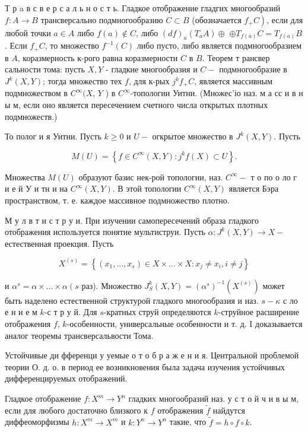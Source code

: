 \documentclass[10pt]{article}
\begin{document}
Т р a в с в е р с а л ь н о с т ь. Гладкое отображение гладгих многообразий $f: A \rightarrow B$ трансверсально подмногообразию $C \subset B$ (обозначается $\left.f_{+} C\right)$, если для любой точки $a \in A$ либо $f(a) \notin C$, либо $(d f)_{a}\left(T_{a} A\right) \oplus$ $\oplus T_{f(a)} C=T_{f(a)} B$. Если $f_{+} C$, то множество $f^{-1}(C)$ либо пусто, либо является подмногообразием в $A$, коразмерность к-рого равна коразмерности $C$ в $B$. Теорем т рансвер сальности тома: пусть $X, Y$ - гладкие многообразия и $C-$ подмногообразие в $J^{k}(X, Y)$; тогда множество тех $f$, для к-рых $j^{k} f_{+} C$, является массивным подмножеством в $C^{\infty}(X$, $Y$ ) в $C^{\infty}$-топологии Уитни. (Множес'іо наз. м а сс и в н ы м, если оно является пересечением счетного числа открытых плотных подмножеств.)

То полог и я Уитни. Пусть $k \geqslant 0$ и $U-$ огкрытое множество в $J^{k}(X, Y)$. Пусть

\[
M(U)=\left\{f \in C^{\infty}(X, Y): j^{k} f(X) \subset U\right\} .
\]

Множества $M(U)$ образуют базис нек-рой топологии, наз. $C^{\infty}-$ т о по о ло г и е й У и тн и на $C^{\infty}(X, Y)$. В этой топологии $C^{\infty}(X, Y)$ является Бэра пространством, т. е. каждое массивное подмножество плотно.

М у л в т и с т р у и. При изучении самопересечений образа гладкого отображения используется понятие мультиструи. Пусть $\alpha: J^{k}(X, Y) \rightarrow X-$ естественная проекция. Пусть

\[
X^{(s)}=\left\{\left(x_{1}, \ldots, x_{s}\right) \in X \times \ldots \times X: x_{j} \neq x_{i}, i \neq j\right\}
\]

и $\alpha^{s}=\alpha \times \ldots \times \alpha\left(s\right.$ раз). Множество $J_{S}^{k}(X, Y)=\left(\alpha^{s}\right)^{-1}\left(X^{(s)}\right)$ может быть наделено естественной структурой гладкого многообразия и наз. $s-\kappa$ с ло е н и е м $k$-с т р у й. Для $s$-кратных струй определяются $k$-струйное расширение отображения $f$, $k$-особенности, универсальные особенности и т. д. I доказывается аналог теоремы трансверсальвости Тома.

Устойчивые ди фференци у уемые о т о б р а ж е н и я. Центральной проблемой теории О. д. о. в период ее возникновения была задача изучения устойчивых дифференцируемых отображений.

Гладкое отображение $f: X^{m} \rightarrow Y^{n}$ гладких многообразий наз. у с т о й ч и в ы м, если для любого достаточно близкого к $f$ отображения $\tilde{f}$ найдутся диффеоморфизмы $h: X^{m} \rightarrow X^{m}$ и $k: Y^{n} \rightarrow Y^{n}$ такие, что $\tilde{f}=h \circ f \circ k$.
\end{document}

